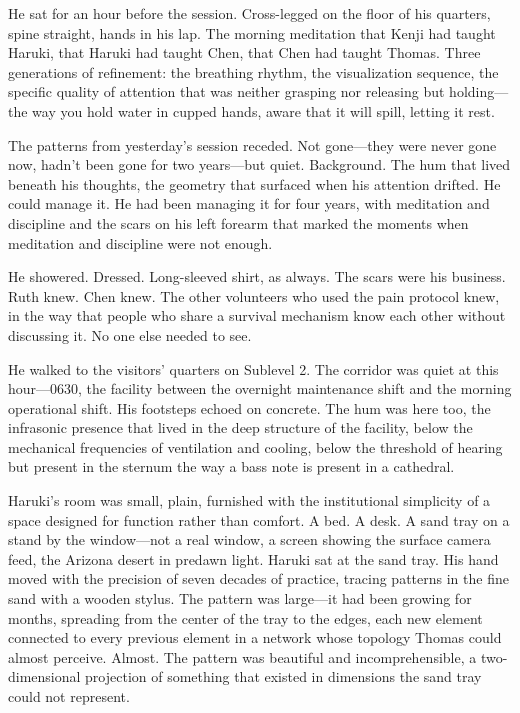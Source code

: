 He sat for an hour before the session. Cross-legged on the floor of his quarters, spine straight, hands in his lap. The morning meditation that Kenji had taught Haruki, that Haruki had taught Chen, that Chen had taught Thomas. Three generations of refinement: the breathing rhythm, the visualization sequence, the specific quality of attention that was neither grasping nor releasing but holding---the way you hold water in cupped hands, aware that it will spill, letting it rest.

The patterns from yesterday's session receded. Not gone---they were never gone now, hadn't been gone for two years---but quiet. Background. The hum that lived beneath his thoughts, the geometry that surfaced when his attention drifted. He could manage it. He had been managing it for four years, with meditation and discipline and the scars on his left forearm that marked the moments when meditation and discipline were not enough.

He showered. Dressed. Long-sleeved shirt, as always. The scars were his business. Ruth knew. Chen knew. The other volunteers who used the pain protocol knew, in the way that people who share a survival mechanism know each other without discussing it. No one else needed to see.

He walked to the visitors' quarters on Sublevel 2. The corridor was quiet at this hour---0630, the facility between the overnight maintenance shift and the morning operational shift. His footsteps echoed on concrete. The hum was here too, the infrasonic presence that lived in the deep structure of the facility, below the mechanical frequencies of ventilation and cooling, below the threshold of hearing but present in the sternum the way a bass note is present in a cathedral.

Haruki's room was small, plain, furnished with the institutional simplicity of a space designed for function rather than comfort. A bed. A desk. A sand tray on a stand by the window---not a real window, a screen showing the surface camera feed, the Arizona desert in predawn light. Haruki sat at the sand tray. His hand moved with the precision of seven decades of practice, tracing patterns in the fine sand with a wooden stylus. The pattern was large---it had been growing for months, spreading from the center of the tray to the edges, each new element connected to every previous element in a network whose topology Thomas could almost perceive. Almost. The pattern was beautiful and incomprehensible, a two-dimensional projection of something that existed in dimensions the sand tray could not represent.


